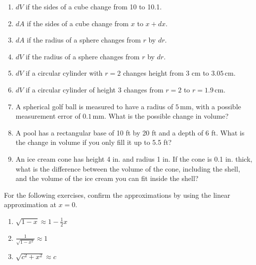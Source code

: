 \documentclass{exercises}
\begin{document}
\begin{enumerate}[resume]
\item $dV$ if the sides of a cube change from 10 to 10.1.
\item $dA$ if the sides of a cube change from $x$ to $x+dx$.
\item $dA$ if the radius of a sphere changes from $r$ by $dr$.
\item $dV$ if the radius of a sphere changes from $r$ by $dr$.
\item $dV$ if a circular cylinder with $r=2$ changes height from 3 cm to $3.05\,\text{cm}$.
\item $dV$ if a circular cylinder of height 3 changes from $r=2$ to $r=1.9\,\text{cm}$.
\item A spherical golf ball is measured to have a radius of $5\,\text{mm}$, with a possible measurement error of $0.1\,\text{mm}$. What is the possible change in volume?
\item A pool has a rectangular base of 10 ft by 20 ft and a depth of 6 ft. What is the change in volume if you only fill it up to 5.5 ft?
\item An ice cream cone has height 4 in. and radius 1 in. If the cone is 0.1 in. thick, what is the difference between the volume of the cone, including the shell, and the volume of the ice cream you can fit inside the shell?
\end{enumerate}

For the following exercises, confirm the approximations by using the linear approximation at $x=0$.

\begin{enumerate}[resume]
\item $\sqrt{1-x}\approx1-\frac{1}{2}x$
\item $\frac{1}{\sqrt{1-x^{2}}}\approx1$
\item $\sqrt{c^{2}+x^{2}}\approx c$
\end{enumerate}
\end{document}
